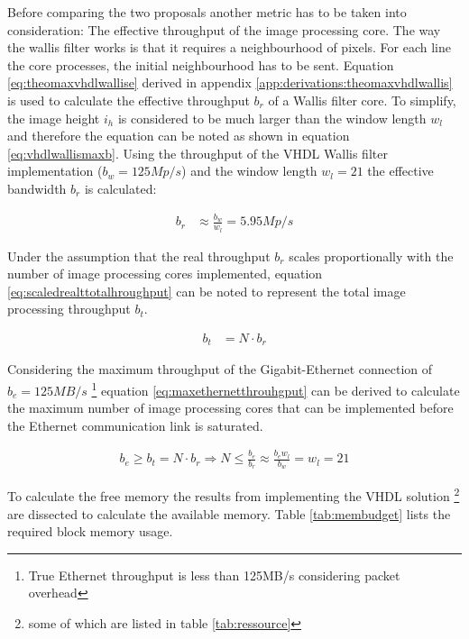 Before comparing the two proposals another metric has to be taken into
consideration: The effective throughput of the image processing core. The way
the wallis filter works is that it requires a neighbourhood of pixels. For each
line the core processes, the initial neighbourhood has to be sent. Equation
\ref{eq:theomaxvhdlwallise} derived in appendix 
\ref{app:derivations:theomaxvhdlwallis} is used to calculate the effective
throughput $b_r$ of a Wallis filter core. To simplify, the image height $i_h$ is
considered to be much larger than the window length $w_l$ and therefore the
equation can be noted as shown in equation \ref{eq:vhdlwallismaxb}. Using the
throughput of the VHDL Wallis filter implementation ($b_w=125Mp/s$) and the
window length $w_l=21$ the effective bandwidth $b_r$ is calculated:

\begin{align}
    b_r  & \approx \frac{b_w}{w_l} = 5.95 Mp/s
    \label{eq:vhdlwallismaxb}
\end{align}

Under the assumption that the real throughput $b_r$ scales proportionally with the
number of image processing cores implemented, equation 
\ref{eq:scaledrealttotalhroughput} can be noted to represent the total image
processing throughput $b_t$.

\begin{align}
    b_t  & = N \cdot b_r
    \label{eq:scaledrealttotalhroughput}
\end{align}

Considering the maximum throughput of the Gigabit-Ethernet connection of
$b_e=125MB/s$ \footnote{True Ethernet throughput is less than 125MB/s
considering packet overhead} equation \ref{eq:maxethernetthrouhgput} can be derived to calculate the
maximum number of image processing cores that can be implemented before the
Ethernet communication link is saturated.

\begin{align}
    b_e \geq b_t = N \cdot b_r \Rightarrow N \leq \frac{b_e}{b_r} \approx 
    \frac{b_e w_l}{b_w} = w_l = 21
    \label{eq:maxethernetthrouhgput}
\end{align}

To calculate the free memory the results from implementing the VHDL solution
\footnote{some of which are listed in table \ref{tab:ressource}} 
are dissected to calculate the available memory. Table \ref{tab:membudget}
lists the required block memory usage.


